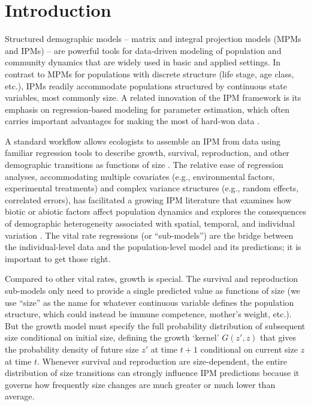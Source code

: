 \documentclass[12pt]{article}
\begin{document}
\newpage
\section{Introduction}

Structured demographic models -- matrix and integral projection models (MPMs and IPMs) -- are powerful tools for data-driven modeling of population and community dynamics that are widely used in basic and applied settings. 
In contrast to MPMs for populations with discrete structure (life stage, age class, etc.), IPMs \citep{easterling2000size} readily accommodate populations structured by continuous state variables, most commonly size. 
A related innovation of the IPM framework is its emphasis on regression-based modeling for parameter estimation, which 
often carries important advantages for making the most of hard-won data \citep{ellner2022critical}.  

A standard workflow allows ecologists to assemble an IPM from data using familiar regression tools to describe growth, survival, reproduction, and other demographic transitions as functions of size \citep{Coulson:2012fk,ellner-etal-2016}. 
The relative ease of regression analyses, accommodating multiple covariates (e.g., environmental factors, experimental treatments) and complex variance structures (e.g., random effects, correlated errors), has facilitated a growing IPM literature that examines how biotic or abiotic factors affect population dynamics \citep[e.g.,][]{schultz2017native,ozgul2010coupled,louthan2022climate} and explores the consequences of demographic heterogeneity associated with spatial, temporal, and individual variation \citep[e.g.,][]{crone2016contrasting,compagnoni2016effect,plard2018sex}. 
The vital rate regressions (or ``sub-models'') are the bridge between the individual-level data and the population-level model and its predictions; it is important to get those right.

Compared to other vital rates, growth is special. 
The survival and reproduction sub-models only need to provide a single predicted value as functions of size (we use ``size'' as the name for whatever continuous variable defines the population structure, which could instead be immune competence, mother's weight, etc.).   
But the growth model must specify the full probability distribution of subsequent size conditional on initial size, defining the  
growth `kernel' $G(z',z)$ that gives the probability density of future size $z'$ at time $t+1$ conditional on current size $z$ at time $t$. 
Whenever survival and reproduction are size-dependent, the entire distribution of size transitions can strongly influence IPM predictions because it governs how frequently size changes are much greater or much lower than average. 
\end{document}
